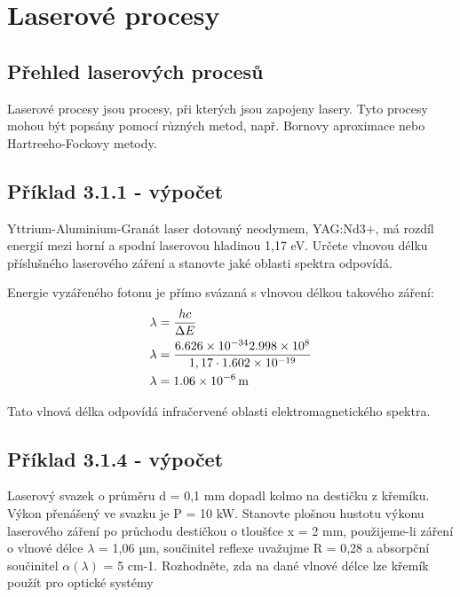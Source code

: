 \section{Laserové procesy}

\subsection{Přehled laserových procesů}

Laserové procesy jsou procesy, při kterých jsou zapojeny lasery. Tyto procesy mohou být popsány pomocí různých metod, např. Bornovy aproximace nebo Hartreeho-Fockovy metody.

\subsection{Příklad 3.1.1 - výpočet}
\begin{zadani}
    Yttrium-Aluminium-Granát laser dotovaný neodymem, YAG:Nd3+, 
    má rozdíl energií mezi horní a spodní laserovou hladinou 1,17 eV. 
    Určete vlnovou délku příslušného laserového záření a stanovte
    jaké oblasti spektra odpovídá.
\end{zadani}


Energie vyzářeného fotonu je přímo svázaná s vlnovou délkou takového záření:
\begin{align*}
  \lambda &= \frac{hc}{\Delta E} \\
  \lambda &= \frac{\num{6.626e-34}\num{2.998e8}}{1,17\cdot \num{1.602e-19}} \\
  \lambda &= \qty{1,06e-6}{\meter}
\end{align*}

Tato vlnová délka odpovídá infračervené oblasti elektromagnetického spektra.


\subsection{Příklad 3.1.4 - výpočet}
\begin{zadani}
    Laserový svazek o průměru d = 0,1 mm  dopadl kolmo na destičku z
    křemíku. Výkon přenášený ve svazku je P = 10 kW.  Stanovte plošnou 
    hustotu výkonu laserového záření po průchodu destičkou o tloušťce 
    x = 2 mm,  použijeme-li záření o vlnové délce \(\lambda\)  = 1,06 µm, součinitel 
    reflexe uvažujme  R = 0,28  a absorpční součinitel \(\alpha(\lambda)\)  = 5 cm-1.
   Rozhodněte, zda na dané vlnové délce lze křemík použít pro optické 
    systémy
\end{zadani}


